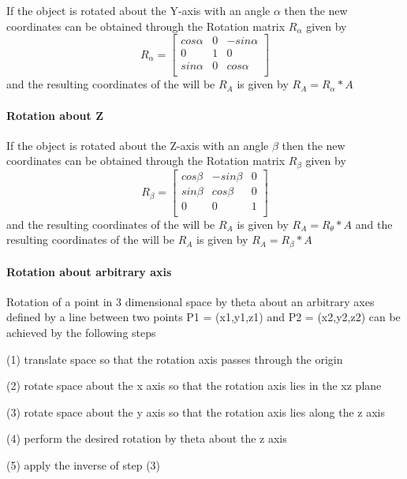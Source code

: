 \documentclass{article}
\begin{document}
If the object is rotated about the Y-axis with an angle $\alpha$ then the new coordinates can be obtained through the Rotation matrix $R_{\alpha}$ given by
\begin{equation}
R_{\alpha} =
\left[\begin{matrix}
cos\alpha & 0 &-sin\alpha\\
0&1&0\\
sin\alpha&0&cos\alpha\\
\end{matrix}\right]
\end{equation}
and the resulting coordinates of the will be $R_{A}$ is given by
$R_{A} = R_{\alpha}*A$

\paragraph{Rotation about Z}

If the object is rotated about the Z-axis with an angle $\beta$ then the new coordinates can be obtained through the Rotation matrix $R_{\beta}$ given by
\begin{equation}
R_{\beta} =
\left[\begin{matrix}
cos\beta&-sin\beta&0\\sin\beta&cos\beta&0\\0&0&1\\
\end{matrix}\right]
\end{equation}
and the resulting coordinates of the will be $R_{A}$ is given by
$R_{A} = R_{\theta}*A$
and the resulting coordinates of the will be $R_{A}$ is given by
$R_{A} = R_{\beta}*A$
\paragraph{Rotation about arbitrary axis}
 Rotation of a point in 3 dimensional space by theta about an arbitrary axes defined by a line between two points P1 = (x1,y1,z1) and P2 = (x2,y2,z2) can be achieved by the following steps

    (1) translate space so that the rotation axis passes through the origin

    (2) rotate space about the x axis so that the rotation axis lies in the xz plane

    (3) rotate space about the y axis so that the rotation axis lies along the z axis

    (4) perform the desired rotation by theta about the z axis

    (5) apply the inverse of step (3)
\end{document}
